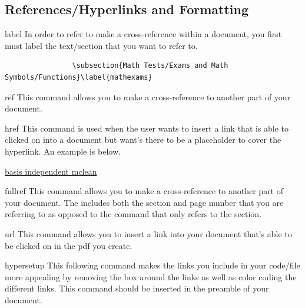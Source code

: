 \documentclass[12pt,hidelinks]{article}
\begin{document}
	\subsection{References/Hyperlinks and Formatting}
		\begin{docCommand}{label}{}
			In order to refer to make a cross-reference within a document, you first must label the text/section that you want to refer to.
		\end{docCommand}
		\begin{verbatim}
	            \subsection{Math Tests/Exams and Math Symbols/Functions}\label{mathexams}
		\end{verbatim}
		\begin{docCommand}{ref}{}
			This command allows you to make a cross-reference to another part of your document. 
		\end{docCommand}
		\begin{docCommand}{href}{}
			This command is used when the user wants to insert a link that is able to clicked on into a document but want's there to be a placeholder to cover the hyperlink. An example is below. 
		\end{docCommand}
\begin{disexam}
\href{mailto:armindubert19@gmail.com}{basis independent mclean}
\end{disexam}
		\begin{docCommand}{fullref}{}
			This command allows you to make a cross-reference to another part of your document. The  includes both the section and page number that you are referring to as opposed to the command  that only refers to the section.
		\end{docCommand}
		\begin{docCommand}{url}{}
			This command allows you to insert a link into your document that's able to be clicked on in the pdf you create.
		\end{docCommand}
		\begin{docCommand}{hypersetup}{}
			This following command makes the links you include in your code/file more appealing by removing the box around the links as well as color coding the different links. This command should be inserted in the preamble of your document.
		\end{docCommand}
\end{document}
